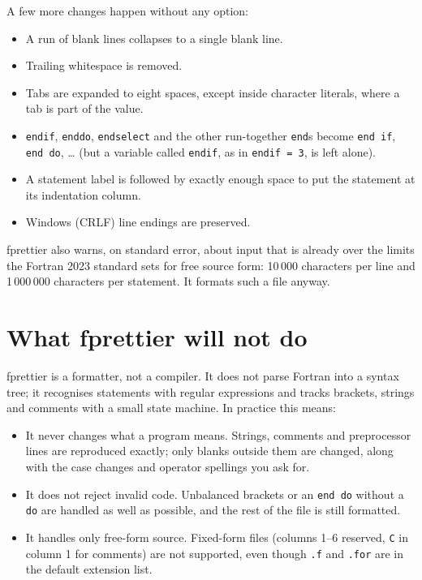 \documentclass[11pt,a4paper,openany]{book}
\newcommand{\code}[1]{\texttt{\small #1}}
\begin{document}
A few more changes happen without any option:

\begin{itemize}
  \item A run of blank lines collapses to a single blank line.
  \item Trailing whitespace is removed.
  \item Tabs are expanded to eight spaces, except inside character literals,
    where a tab is part of the value.
  \item \code{endif}, \code{enddo}, \code{endselect} and the other run-together
    \code{end}s become \code{end if}, \code{end do}, \ldots{} (but a variable
    called \code{endif}, as in \code{endif = 3}, is left alone).
  \item A statement label is followed by exactly enough space to put the
    statement at its indentation column.
  \item Windows (CRLF) line endings are preserved.
\end{itemize}

fprettier also warns, on standard error, about input that is already over the
limits the Fortran 2023 standard sets for free source form: 10\,000 characters
per line and 1\,000\,000 characters per statement. It formats such a file
anyway.

\section{What fprettier will not do}

fprettier is a formatter, not a compiler. It does not parse Fortran into a
syntax tree; it recognises statements with regular expressions and tracks
brackets, strings and comments with a small state machine. In practice this means:

\begin{itemize}
  \item It never changes what a program means. Strings, comments and
    preprocessor lines are reproduced exactly; only blanks outside them are
    changed, along with the case changes and operator spellings you ask for.
  \item It does not reject invalid code. Unbalanced brackets or an \code{end
    do} without a \code{do} are handled as well as possible, and the rest of the
    file is still formatted.
  \item It handles only free-form source. Fixed-form files (columns 1--6
    reserved, \code{C} in column 1 for comments) are not supported, even though
    \code{.f} and \code{.for} are in the default extension list.
\end{itemize}
\end{document}
